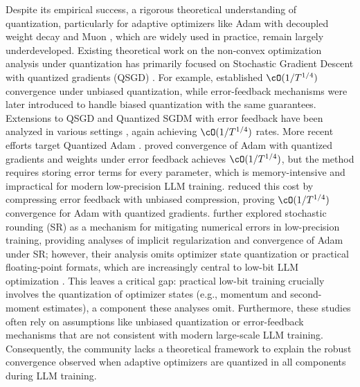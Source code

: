 \documentclass[11pt, letterpaper]{article}
\begin{document}
Despite its empirical success, a rigorous theoretical understanding of quantization, particularly for adaptive optimizers like Adam \citep{kingma2014adam} with decoupled weight decay \citep{loshchilov2018decoupled} and Muon \citep{jordan2024muon}, which are widely used in practice, remain largely underdeveloped. Existing theoretical work on the non-convex optimization analysis under quantization has primarily focused on Stochastic Gradient Descent with quantized gradients (QSGD) \citep{alistarh2017qsgd}. For example, \citet{jiang2018qsgd} established $\cO(1/T^{1/4})$ convergence under unbiased quantization, while error-feedback mechanisms \citep{karimireddy2019error} were later introduced to handle biased quantization with the same guarantees. Extensions to QSGD and Quantized SGDM with error feedback have been analyzed in various settings \citep{tang2019deepsqueeze,zheng2019communication,Koloskova2020Decentralized}, again achieving $\cO(1/T^{1/4})$ rates. More recent efforts target Quantized Adam \citep{chen2021quantized,modoranu2024microadam,ozkara2025stochastic}. \citet{chen2021quantized} proved convergence of Adam with quantized gradients and weights under error feedback achieves $\cO(1/T^{1/4})$, but the method requires storing error terms for every parameter, which is memory-intensive and impractical for modern low-precision LLM training. \citet{modoranu2024microadam} reduced this cost by compressing error feedback with unbiased compression, proving $\cO(1/T^{1/4})$ convergence for Adam with quantized gradients. \citet{ozkara2025stochastic} further explored stochastic rounding (SR) as a mechanism for mitigating numerical errors in low-precision training, providing analyses of implicit regularization and convergence of Adam under SR; however, their analysis omits optimizer state quantization or practical floating-point formats, which are increasingly central to low-bit LLM optimization \citep{dettmers2021adam8bit,xi2025coat,fishman2025scaling}. This leaves a critical gap: practical low-bit training crucially involves the quantization of optimizer states (e.g., momentum and second-moment estimates), a component these analyses omit. Furthermore, these studies often rely on assumptions like unbiased quantization or error-feedback mechanisms that are not consistent with modern large-scale LLM training. Consequently, the community lacks a theoretical framework to explain the robust convergence observed when adaptive optimizers are quantized in all components during LLM training.
\end{document}

